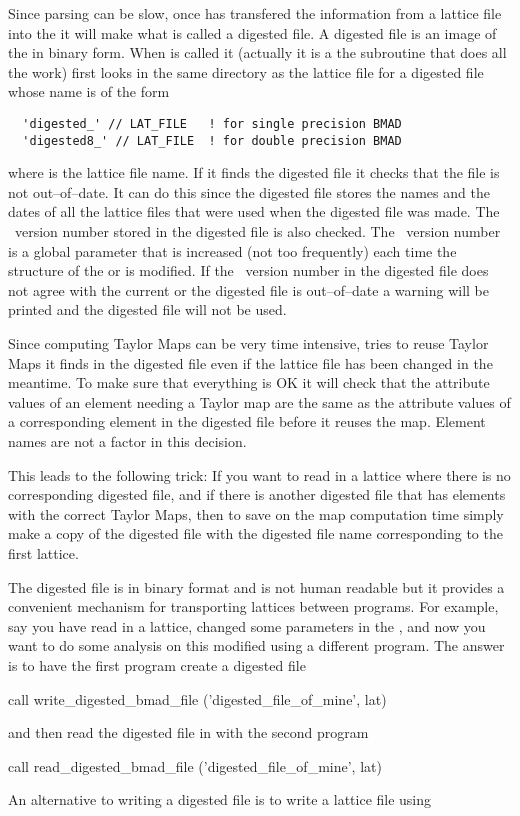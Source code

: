 Since parsing can be slow, once  has transfered the
information from a lattice file into the  it will make
what is called a digested file. A digested file is an image of the
 in binary form. When  is called it
(actually it is a the subroutine  that
does all the work) first looks in the same directory as the lattice
file for a digested file whose name is of the form
\begin{verbatim}
  'digested_' // LAT_FILE   ! for single precision BMAD 
  'digested8_' // LAT_FILE  ! for double precision BMAD 
\end{verbatim}
where  is the lattice file name. If it finds the digested
file it checks that the file is not out--of--date. It can do this
since the digested file stores the names and the dates of all the
lattice files that were used when the digested file was made. The
\bmad\ version number stored in the digested file is also checked. The
\bmad\ version number is a global parameter that is increased (not too
frequently) each time the structure of the  or
 is modified. If the \bmad\ version number in the
digested file does not agree with the current or the digested file is
out--of--date a warning will be printed and the digested file will not
be used.

Since computing Taylor Maps can be very time intensive,
 tries to reuse Taylor Maps it finds in the digested
file even if the lattice file has been changed in the meantime. To
make sure that everything is OK it will check that the attribute
values of an element needing a Taylor map are the same as the
attribute values of a corresponding element in the digested file
before it reuses the map. Element names are not a factor in this
decision.

This leads to the following trick: If you want to read in a lattice
where there is no corresponding digested file, and if there is another
digested file that has elements with the correct Taylor Maps, then to
save on the map computation time simply make a copy of the digested
file with the digested file name corresponding to the first lattice.

The digested file is in binary format and is not human readable but it
provides a convenient mechanism for transporting lattices between
programs. For example, say you have read in a lattice, changed
some parameters in the , and now you want to do some
analysis on this modified  using a different program. The 
answer is to have the first program create a digested file
\begin{example}
  call write_digested_bmad_file ('digested_file_of_mine', lat)
\end{example}
and then read the digested file in with the second program
\begin{example}
  call read_digested_bmad_file ('digested_file_of_mine', lat)
\end{example}
An alternative to writing a digested file is to write a lattice file
using 

